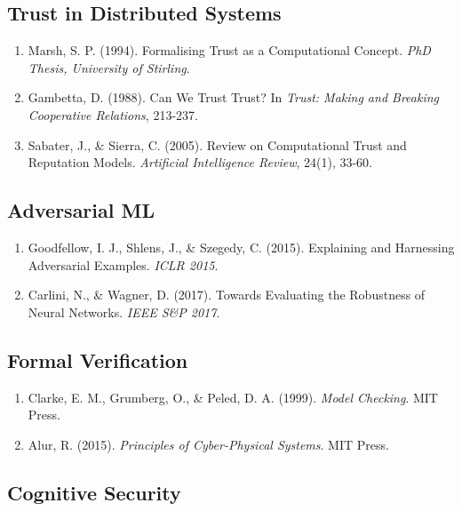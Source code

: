 \documentclass[
]{article}
\begin{document}
\subsection{Trust in Distributed
Systems}\label{trust-in-distributed-systems}

\begin{enumerate}
\def\labelenumi{\arabic{enumi}.}
\item
  Marsh, S. P. (1994). Formalising Trust as a Computational Concept.
  \emph{PhD Thesis, University of Stirling}.
\item
  Gambetta, D. (1988). Can We Trust Trust? In \emph{Trust: Making and
  Breaking Cooperative Relations}, 213-237.
\item
  Sabater, J., \& Sierra, C. (2005). Review on Computational Trust and
  Reputation Models. \emph{Artificial Intelligence Review}, 24(1),
  33-60.
\end{enumerate}

\subsection{Adversarial ML}\label{adversarial-ml}

\begin{enumerate}
\def\labelenumi{\arabic{enumi}.}
\item
  Goodfellow, I. J., Shlens, J., \& Szegedy, C. (2015). Explaining and
  Harnessing Adversarial Examples. \emph{ICLR 2015}.
\item
  Carlini, N., \& Wagner, D. (2017). Towards Evaluating the Robustness
  of Neural Networks. \emph{IEEE S\&P 2017}.
\end{enumerate}

\subsection{Formal Verification}\label{formal-verification}

\begin{enumerate}
\def\labelenumi{\arabic{enumi}.}
\item
  Clarke, E. M., Grumberg, O., \& Peled, D. A. (1999). \emph{Model
  Checking}. MIT Press.
\item
  Alur, R. (2015). \emph{Principles of Cyber-Physical Systems}. MIT
  Press.
\end{enumerate}

\subsection{Cognitive Security}\label{cognitive-security}
\end{document}

